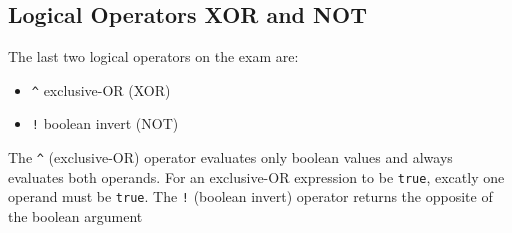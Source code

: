 \subsection{Logical Operators XOR and NOT}
The last two logical operators on the exam are:
\begin{itemize}
    \item \verb#^# exclusive-OR (XOR)
    \item \verb#!# boolean invert (NOT)
\end{itemize}
The \verb#^# (exclusive-OR) operator evaluates only boolean values and always 
evaluates both operands. For an exclusive-OR expression to be \verb#true#, 
excatly one operand must be \verb#true#. The \verb#!# (boolean invert) operator 
returns the opposite of the boolean argument
